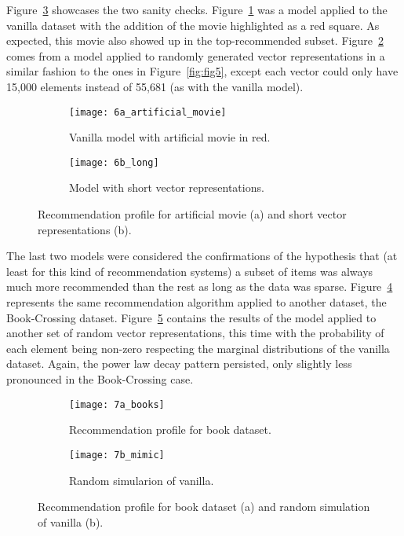Figure~\ref{fig:fig6} showcases the two sanity checks. Figure~\ref{fig:fig6a}
was a model applied to the vanilla dataset with the addition of the movie
highlighted as a red square. As expected, this movie also showed up in the
top-recommended subset. Figure~\ref{fig:fig6b} comes from a model applied to
randomly generated vector representations in a similar fashion to the ones in
Figure~\ref{fig:fig5}, except each vector could only have 15,000 elements
instead of 55,681 (as with the vanilla model).

\begin{figure}
  \centering
  \begin{subfigure}{0.45\textwidth}
    \centering
    \texttt{[image: 6a\_artificial\_movie]}
    \caption{Vanilla model with artificial movie in red.\label{fig:fig6a}}
  \end{subfigure}
  \begin{subfigure}{0.45\textwidth}
    \centering
    \texttt{[image: 6b\_long]}
    \caption{Model with short vector representations.\label{fig:fig6b}}
  \end{subfigure}
  \caption{Recommendation profile for artificial movie (a) and short vector
    representations (b).\label{fig:fig6}}
\end{figure}

The last two models were considered the confirmations of the hypothesis that (at
least for this kind of recommendation systems) a subset of items was always much
more recommended than the rest as long as the data was sparse.
Figure~\ref{fig:fig7a} represents the same recommendation algorithm applied to
another dataset, the Book-Crossing dataset. Figure~\ref{fig:fig7b} contains the
results of the model applied to another set of random vector representations,
this time with the probability of each element being non-zero respecting the
marginal distributions of the vanilla dataset. Again, the power law decay
pattern persisted, only slightly less pronounced in the Book-Crossing case.

\begin{figure}
  \centering
  \begin{subfigure}{0.45\textwidth}
    \centering
    \texttt{[image: 7a\_books]}
    \caption{Recommendation profile for book dataset.\label{fig:fig7a}}
  \end{subfigure}
  \begin{subfigure}{0.45\textwidth}
    \centering
    \texttt{[image: 7b\_mimic]}
    \caption{Random simularion of vanilla.\label{fig:fig7b}}
  \end{subfigure}
  \caption{Recommendation profile for book dataset (a) and random simulation of
    vanilla (b).\label{fig:fig7}}
\end{figure}

